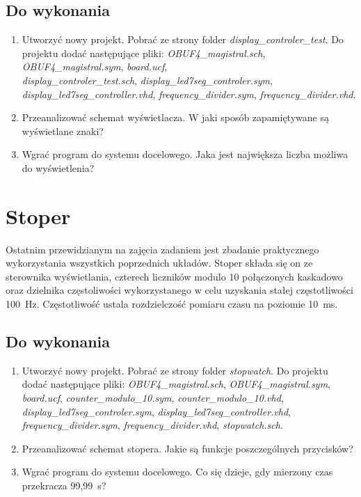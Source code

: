 \documentclass[12pt]{article}
\begin{document}
\subsection{Do wykonania}
\begin{enumerate}[wide, labelwidth=!, labelindent=0pt]
\item Utworzyć nowy projekt. Pobrać ze strony folder \textit{display\_controler\_test}. Do projektu dodać następujące pliki: \textit{OBUF4\_magistral.sch}, \textit{OBUF4\_magistral.sym}, \textit{board.ucf},\\ \textit{display\_controler\_test.sch}, \textit{display\_led7seg\_controler.sym}, \textit{display\_led7seg\_controller.vhd}, \textit{frequency\_divider.sym}, \textit{frequency\_divider.vhd}.
\item Przeanalizować schemat wyświetlacza. W jaki sposób zapamiętywane są wyświetlane znaki?
\item Wgrać program do systemu docelowego. Jaka jest największa liczba możliwa do wyświetlenia?
\end{enumerate}
\section{Stoper}
Ostatnim przewidzianym na zajęcia zadaniem jest zbadanie praktycznego wykorzystania wszystkich poprzednich układów. Stoper składa się on ze sterownika wyświetlania, czterech liczników modulo 10 połączonych kaskadowo oraz dzielnika częstoliwości wykorzystanego w celu uzyskania stałej częstotliwości 100~Hz. Częstotliwość ustala rozdzielczość pomiaru czasu na poziomie 10~ms.
\subsection{Do wykonania}
\begin{enumerate}[wide, labelwidth=!, labelindent=0pt]
\item Utworzyć nowy projekt. Pobrać ze strony folder \textit{stopwatch}. Do projektu dodać następujące pliki: \textit{OBUF4\_magistral.sch}, \textit{OBUF4\_magistral.sym}, \textit{board.ucf}, \textit{counter\_modulo\_10.sym}, \textit{counter\_modulo\_10.vhd}, \textit{display\_led7seg\_controler.sym}, \textit{display\_led7seg\_controller.vhd},\\ \textit{frequency\_divider.sym}, \textit{frequency\_divider.vhd}, \textit{stopwatch.sch}.
\item Przeanalizować schemat stopera. Jakie są funkcje poszczególnych przycisków?
\item Wgrać program do systemu docelowego. Co się dzieje, gdy mierzony czas przekracza 99,99~s?
\end{enumerate}
\end{document}
